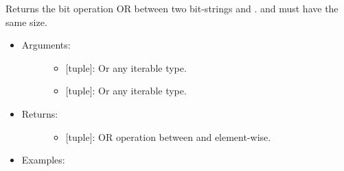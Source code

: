 \documentclass[letterpaper,10pt,english]{sphinxmanual}
\begin{document}
\begin{fulllineitems}
\label{\detokenize{iterables:data_tools.iterables.bit_or}}
Returns the bit operation OR between two bit-strings  and .
  and  must have the same size.
\begin{itemize}
\item {} \begin{description}
\item[{Arguments:}] \leavevmode\begin{itemize}
\item {} 
 {[}tuple{]}: Or any iterable type.

\item {} 
 {[}tuple{]}: Or any iterable type.

\end{itemize}

\end{description}

\item {} \begin{description}
\item[{Returns:}] \leavevmode\begin{itemize}
\item {} 
{[}tuple{]}: OR operation between  and  element-wise.

\end{itemize}

\end{description}

\item {} \begin{description}
\item[{Examples:}] \leavevmode
\begin{sphinxVerbatim}[commandchars=\\\{\}]
        
 
\end{sphinxVerbatim}

\end{description}

\end{itemize}

\end{fulllineitems}
\end{document}
